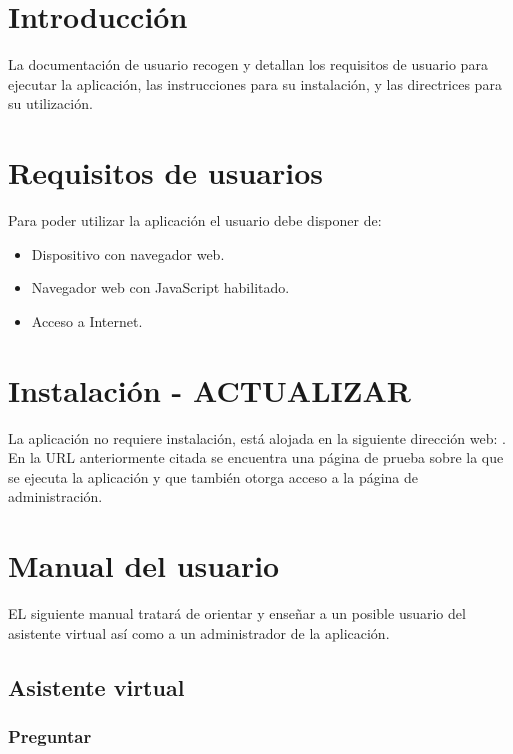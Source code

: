 
\section{Introducción}

La documentación de usuario recogen y detallan los requisitos de usuario para ejecutar la aplicación, las instrucciones para su instalación, y las directrices para su utilización.

\section{Requisitos de usuarios}

Para poder utilizar la aplicación el usuario debe disponer de:

\begin{itemize}
\tightlist
\item Dispositivo con navegador web.
\item Navegador web con JavaScript habilitado.
\item Acceso a Internet.
\end{itemize}

\section{Instalación - ACTUALIZAR}

La aplicación no requiere instalación, está alojada en la siguiente dirección web: .
En la URL anteriormente citada se encuentra una página de prueba sobre la que se ejecuta la aplicación y que también otorga acceso a la página de administración.

\section{Manual del usuario}

EL siguiente manual tratará de orientar y enseñar a un posible usuario del asistente virtual así como a un administrador de la aplicación.

\subsection{Asistente virtual}

\subsubsection{Preguntar}

